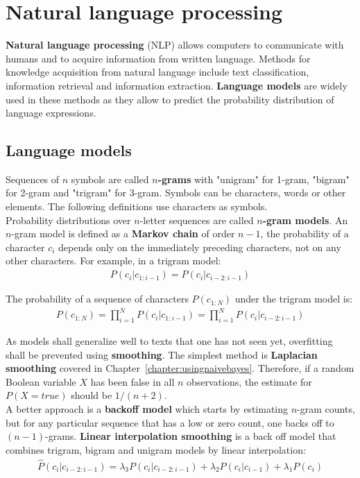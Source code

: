 \documentclass{report}
\begin{document}
\chapter{Natural language processing}
{\bf Natural language processing} (NLP) allows computers to communicate with humans and to acquire information from written language.
Methods for knowledge acquisition from natural language include text classification, information retrieval and information extraction.
{\bf Language models} are widely used in these methods as they allow to predict the probability distribution of language expressions.

\section{Language models}
Sequences of $n$ symbols are called {\bf $n$-grams} with "unigram" for 1-gram, "bigram" for 2-gram and "trigram" for 3-gram.
Symbols can be characters, words or other elements. The following definitions use characters as symbols.
\\
Probability distributions over $n$-letter sequences are called {\bf $n$-gram models}.
An $n$-gram model is defined as a {\bf Markov chain} of order $n-1$, the probability of a character $c_i$ depends only on the immediately preceding characters, not on any other characters.
For example, in a trigram model:
\begin{align*}
P(c_i\vert c_{1:i-1}) = P(c_i\vert c_{i-2:i-1})
\end{align*}

The probability of a sequence of characters $P(c_{1:N})$ under the trigram model is:
\begin{align*}
P(c_{1:N}) = \prod_{i=1}^N P(c_i\vert c_{1:i-1}) = \prod_{i=1}^N P(c_i\vert c_{i-2:i-1})
\end{align*}

As models shall generalize well to texts that one has not seen yet, overfitting shall be prevented using {\bf smoothing}. The simplest method is {\bf Laplacian smoothing} covered in Chapter~\ref{chapter:usingnaivebayes}.
Therefore, if a random Boolean variable $X$ has been false in all $n$ observations, the estimate for $P(X=true)$ should be $1/(n+2)$.
\\
A better approach is a {\bf backoff model} which starts by estimating $n$-gram counts, but for any particular sequence that has a low or zero count, one backs off to $(n-1)$-grams.
{\bf Linear interpolation smoothing} is a back off model that combines trigram, bigram and unigram models by linear interpolation:
\begin{align*}
\hat{P}(c_i\vert c_{i-2:i-1}) = \lambda_3 P(c_i\vert c_{i-2:i-1}) + \lambda_2 P(c_i\vert c_{i-1}) + \lambda_1 P(c_i)
\end{align*}
\end{document}
